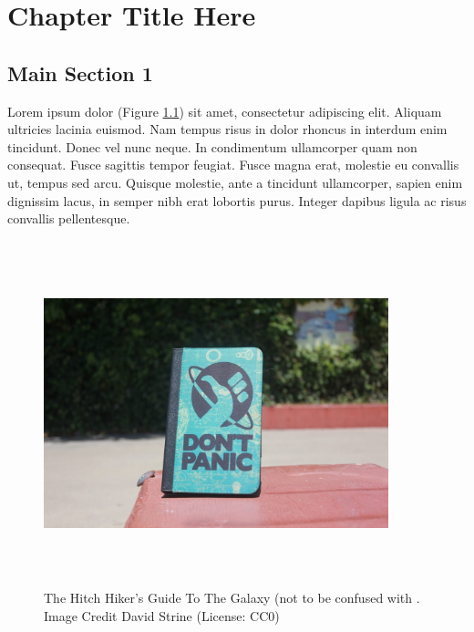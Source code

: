 
\chapter{Chapter Title Here}\label{chapter:firstchapter} %

\label{ChapterX} %


\section{Main Section 1}\label{sec:firstsection}

Lorem ipsum dolor (Figure \ref{fig:ThisFig}) sit amet, consectetur adipiscing elit\cite{fleischman1994pragmatics}.
Aliquam ultricies lacinia euismod.
Nam tempus risus in dolor rhoncus in interdum enim tincidunt.
Donec vel nunc neque.
In condimentum ullamcorper quam non consequat.
Fusce sagittis tempor feugiat.
Fusce magna erat, molestie eu convallis ut, tempus sed arcu.
Quisque molestie, ante a tincidunt ullamcorper, sapien enim dignissim lacus, in semper nibh erat lobortis purus.
Integer dapibus ligula ac risus convallis pellentesque.

\begin{figure}
\begin{centering}
\includegraphics[width=10cm,height=10cm,keepaspectratio]{Figures/dont-panic-e1534046233310.jpg}
\caption{The Hitch Hiker's Guide To The Galaxy (not to be confused with \cite{Reference1}. Image Credit David Strine (License: CC0)}
\label{fig:ThisFig}
\end{centering}
\end{figure}

